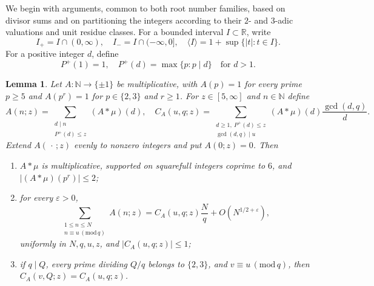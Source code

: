\documentclass[12pt,reqno]{amsart}
\numberwithin{equation}{section}
\newtheorem{lemma}[theorem]{Lemma}
\theoremstyle{definition}
\renewcommand{\le}{\leqslant}
\renewcommand{\ge}{\geqslant}
\newcommand{\NN}{\mathbb{N}}
\newcommand{\RR}{\mathbb{R}}
\renewcommand{\pmod}[1]{\,(\mathrm{mod}\,#1)}
\begin{document}
We begin with arguments, common to both root number families, based on divisor sums and on partitioning the integers according to their $2$- and $3$-adic valuations and unit residue classes.
For a bounded interval $I\subset\RR$, write
\begin{equation}\label{eq:interval-notation}
I_+=I\cap(0,\infty),\quad I_-=I\cap(-\infty,0],
\quad
\langle I\rangle=1+\sup\{|t|:t\in I\}.
\end{equation}
For a positive integer $d$, define
\begin{equation}\label{eq:def-Pplus}
P^+(1)=1,\quad P^+(d)=\max\{p:p\mid d\}\quad\text{for }d>1.
\end{equation}

\begin{lemma}\label{lem:squarefull-kernel}
Let $A:\NN\to\{\pm1\}$ be multiplicative, with $A(p)=1$ for every prime $p\ge5$ and $A(p^r)=1$ for $p\in\{2,3\}$ and $r\ge1$.
For $z\in[5,\infty]$ and $n\in\NN$ define
\[
A(n;z)=\sum_{\substack{d\mid n\\P^+(d)\le z}}(A*\mu)(d),\quad
C_A(u,q;z)=\sum_{\substack{d\ge1,\ P^+(d)\le z\\\gcd(d,q)\mid u}}
(A*\mu)(d)\frac{\gcd(d,q)}d.
\]
Extend $A(\,\cdot\,;z)$ evenly to nonzero integers and put $A(0;z)=0$.
Then
\begin{enumerate}
\item $A*\mu$ is multiplicative, supported on squarefull integers coprime to $6$, and $|(A*\mu)(p^r)|\le2$;
\item for every $\varepsilon>0$,
\[
\sum_{\substack{1\le n\le N\\n\equiv u\pmod q}}A(n;z)
=C_A(u,q;z)\frac Nq+O(N^{1/2+\varepsilon}),
\]
uniformly in $N,q,u,z$, and $|C_A(u,q;z)|\le1$;
\item if $q\mid Q$, every prime dividing $Q/q$ belongs to $\{2,3\}$, and $v\equiv u\pmod q$, then $C_A(v,Q;z)=C_A(u,q;z)$.
\end{enumerate}
\end{lemma}
\end{document}
